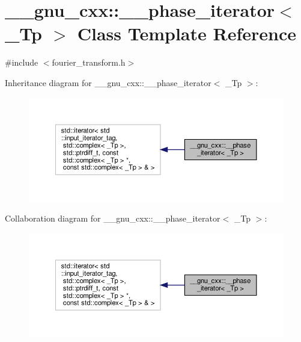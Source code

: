 \hypertarget{class____gnu__cxx_1_1____phase__iterator}{}\section{\+\_\+\+\_\+gnu\+\_\+cxx\+:\+:\+\_\+\+\_\+phase\+\_\+iterator$<$ \+\_\+\+Tp $>$ Class Template Reference}
\label{class____gnu__cxx_1_1____phase__iterator}


{\ttfamily \#include $<$fourier\+\_\+transform.\+h$>$}



Inheritance diagram for \+\_\+\+\_\+gnu\+\_\+cxx\+:\+:\+\_\+\+\_\+phase\+\_\+iterator$<$ \+\_\+\+Tp $>$\+:
\nopagebreak
\begin{figure}[H]
\begin{center}
\leavevmode
\includegraphics[width=350pt]{class____gnu__cxx_1_1____phase__iterator__inherit__graph}
\end{center}
\end{figure}


Collaboration diagram for \+\_\+\+\_\+gnu\+\_\+cxx\+:\+:\+\_\+\+\_\+phase\+\_\+iterator$<$ \+\_\+\+Tp $>$\+:
\nopagebreak
\begin{figure}[H]
\begin{center}
\leavevmode
\includegraphics[width=350pt]{class____gnu__cxx_1_1____phase__iterator__coll__graph}
\end{center}
\end{figure}
